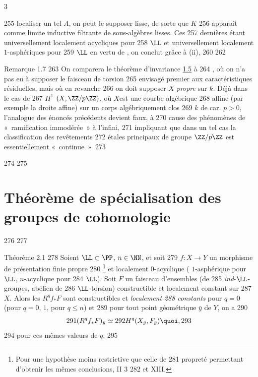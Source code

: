 3	\documentclass[10pt]{../fichiers-configuration-latex/smfart}
\begin{document}
   255	localiser un tel $A$, on peut le supposer lisse, de sorte que $K$
   256	apparaît comme limite inductive filtrante de sous-algèbres lisses. Ces
   257	dernières étant universellement localement acycliques pour
   258	$\LL$ et universellement localement $1$-asphériques pour
   259	$\LL$ en vertu de , on conclut grâce à  (ii),
   260		
   262	\begin{enonce*}[remark]{Remarque 1.7}
   263	On comparera le théorème d'invariance \hyperref[XVI.cor1.5]{1.5} à
   264	, où on n'a pas eu à supposer le faisceau de torsion
   265	envisagé premier aux caractéristiques résiduelles, mais où en revanche
   266	on doit supposer $X$ \emph{propre} sur $k$. Déjà dans le cas de
   267	$H^{1}$ $(X,\ZZ/p\ZZ)$, où $X$\pageoriginale est une courbe algébrique
   268	affine (par exemple la droite affine) sur un corps algébriquement clos
   269	$k$ de car. $p>0$, l'analogue des énoncés précédents devient faux, à
   270	cause des phénomènes de « ramification immodérée » à l'infini,
   271	impliquant que dans un tel cas la classification des revêtements
   272	étales principaux de groupe $\ZZ/p\ZZ$ est essentiellement « continue ».
   273	\end{enonce*}
   274	
   275	\section{Théorème de spécialisation des groupes de cohomologie}
   276	
   277	\begin{enonce*}{Théorème 2.1}
   278	Soient $\LL\subset \PP$, $n\in \NN$, et soit
   279	$f:X\rightarrow Y$ un morphisme de présentation finie propre
   280	\footnote[1]{Pour une hypothèse moins restrictive que celle de
   281	  propreté permettant d'obtenir les mêmes conclusions, \cf {} II 3
   282	et  XIII.} et localement $0$-acyclique (	 $1$-asphérique pour $\LL$, \resp {} $n$-acyclique pour
   284	$\LL$). Soit $F$ un faisceau d'ensembles (\resp de
   285	\emph{ind}-$\LL$-groupes, \resp abélien de
   286	$\LL$-torsion) constructible et localement constant sur
   287	$X$. Alors les $R^{q}f_{\ast}F$ sont constructibles et \emph{localement
   288	constants} pour $q=0$ (\resp pour $q=0$, $1$, \resp pour $q\leq n$) et
   289	pour tout point géométrique $\bar{y}$ de $Y$, on a
   290	$$
   291	(R^{q}f_{\ast}F)_{\bar{y}}\simeq
   292	H^{q}(X_{\bar{y}},F_{\bar{y}}){\quoi},
   293	$$
   294	pour ces mêmes valeurs de $q$. 
   295	\end{enonce*}
\end{document}
